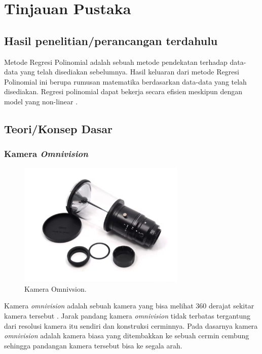 \section{Tinjauan Pustaka}
\label{sec:tinjauanpustaka}

\subsection{Hasil penelitian/perancangan terdahulu}
Metode Regresi Polinomial adalah sebuah metode pendekatan terhadap data-data yang telah disediakan sebelumnya. Hasil keluaran dari metode Regresi Polinomial ini berupa rumusan matematika berdasarkan data-data yang telah disediakan. Regresi polinomial dapat bekerja secara efisien meskipun dengan model yang non-linear 
\citet{ref_regresi}.

\subsection{Teori/Konsep Dasar}

\subsubsection{Kamera \emph{Omnivision}}
\label{sec:omnivision}
\begin{figure}[ht]
    \centering
  
    \includegraphics[width=8cm]{gambar/omnivisino2.jpeg}
  
    \caption{Kamera Omnivsion.}
    \label{fig:omnivision}
\end{figure}
Kamera \emph{omnivision} adalah sebuah kamera yang bisa melihat 360 derajat sekitar 
kamera tersebut \citet{ref_kamera_omni}. 
Jarak pandang kamera \emph{omnivision} tidak terbatas 
tergantung dari resolusi kamera itu sendiri dan 
konstruksi cerminnya. Pada dasarnya kamera \emph{omnivision} 
adalah kamera biasa yang ditembakkan ke sebuah cermin cembung 
sehingga pandangan kamera tersebut bisa ke segala arah. 

